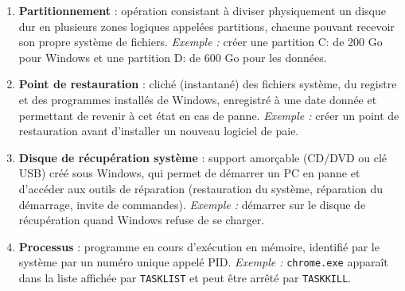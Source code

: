 \documentclass[11pt]{article}
\begin{document}
\begin{corrige}
\begin{enumerate}
  \item \textbf{Partitionnement} : opération consistant à diviser physiquement un disque dur en plusieurs zones logiques appelées partitions, chacune pouvant recevoir son propre système de fichiers. \emph{Exemple :} créer une partition C: de 200 Go pour Windows et une partition D: de 600 Go pour les données.
  \item \textbf{Point de restauration} : cliché (instantané) des fichiers système, du registre et des programmes installés de Windows, enregistré à une date donnée et permettant de revenir à cet état en cas de panne. \emph{Exemple :} créer un point de restauration avant d'installer un nouveau logiciel de paie.
  \item \textbf{Disque de récupération système} : support amorçable (CD/DVD ou clé USB) créé sous Windows, qui permet de démarrer un PC en panne et d'accéder aux outils de réparation (restauration du système, réparation du démarrage, invite de commandes). \emph{Exemple :} démarrer sur le disque de récupération quand Windows refuse de se charger.
  \item \textbf{Processus} : programme en cours d'exécution en mémoire, identifié par le système par un numéro unique appelé PID. \emph{Exemple :} \texttt{chrome.exe} apparaît dans la liste affichée par \texttt{TASKLIST} et peut être arrêté par \texttt{TASKKILL}.
\end{enumerate}
\end{corrige}
\end{document}
